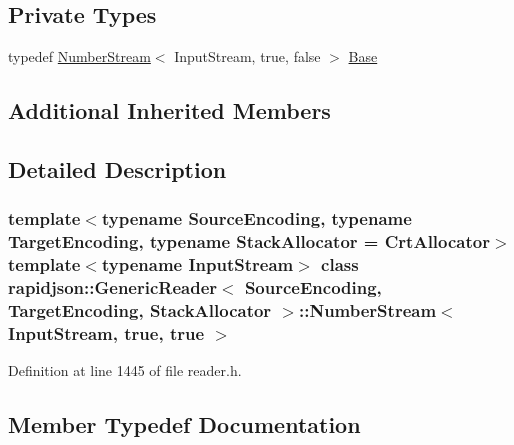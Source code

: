 \subsection*{Private Types}
\begin{DoxyCompactItemize}
\item 
typedef \mbox{\hyperlink{classrapidjson_1_1_generic_reader_1_1_number_stream}{Number\+Stream}}$<$ Input\+Stream, true, false $>$ \mbox{\hyperlink{classrapidjson_1_1_generic_reader_1_1_number_stream_3_01_input_stream_00_01true_00_01true_01_4_a8c271ecdecf7eabf3726b57d78c2ff5a}{Base}}
\end{DoxyCompactItemize}
\subsection*{Additional Inherited Members}


\subsection{Detailed Description}
\subsubsection*{template$<$typename Source\+Encoding, typename Target\+Encoding, typename Stack\+Allocator = Crt\+Allocator$>$\newline
template$<$typename Input\+Stream$>$\newline
class rapidjson\+::\+Generic\+Reader$<$ Source\+Encoding, Target\+Encoding, Stack\+Allocator $>$\+::\+Number\+Stream$<$ Input\+Stream, true, true $>$}



Definition at line 1445 of file reader.\+h.



\subsection{Member Typedef Documentation}
\mbox{\label{classrapidjson_1_1_generic_reader_1_1_number_stream_3_01_input_stream_00_01true_00_01true_01_4_a8c271ecdecf7eabf3726b57d78c2ff5a}} 
